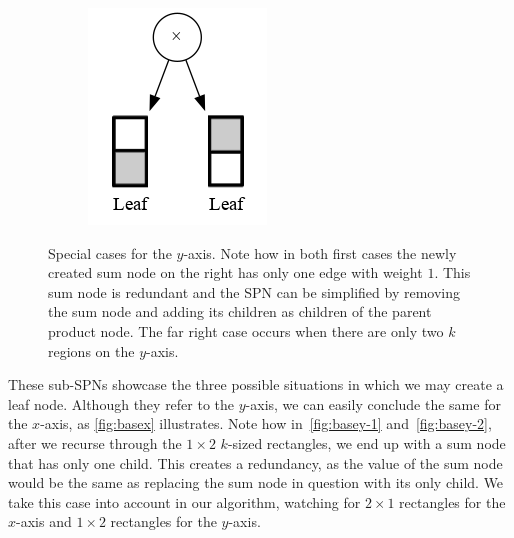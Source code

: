 \documentclass{amsart}
\theoremstyle{plain}
\numberwithin{equation}{section}
\begin{document}
\begin{figure}[h]
\begin{subfigure}[b]{0.3\linewidth}
    \caption{\label{fig:basey-2}}
  \end{subfigure}
  \begin{subfigure}[b]{0.3\linewidth}
    \centering\includegraphics[scale=0.3]{graphs/cc5.png}
    \caption{\label{fig:basey-2}}
  \end{subfigure}
  \captionsetup{justification=raggedright}
  \caption{Special cases for the $y$-axis. Note how in both first cases the newly created sum node
  on the right has only one edge with weight $1$. This sum node is redundant and the SPN can be
  simplified by removing the sum node and adding its children as children of the parent product
  node. The far right case occurs when there are only two $k$ regions on the $y$-axis.}\label{fig:basey}
\end{figure}

These sub-SPNs showcase the three possible situations in which we may create a leaf node. Although
they refer to the $y$-axis, we can easily conclude the same for the $x$-axis, as
\autoref{fig:basex} illustrates. Note how in~\autoref{fig:basey-1} and~\autoref{fig:basey-2}, after
we recurse through the $1\times 2$ $k$-sized rectangles, we end up with a sum node that has only
one child. This creates a redundancy, as the value of the sum node would be the same as replacing
the sum node in question with its only child. We take this case into account in our algorithm,
watching for $2\times 1$ rectangles for the $x$-axis and $1\times 2$ rectangles for the $y$-axis.
\end{document}
